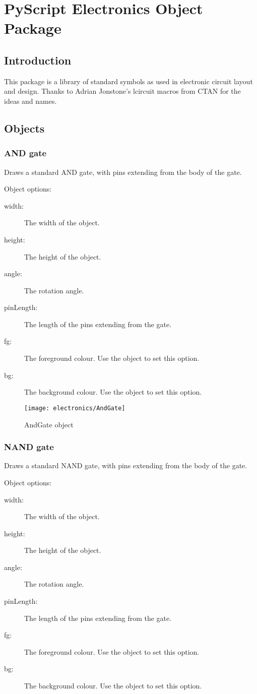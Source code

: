 \chapter{PyScript Electronics Object Package}

\section{Introduction}

This package is a library of standard symbols as used in electronic circuit
layout and design.  Thanks to Adrian Jonstone's lcircuit macros from CTAN
for the ideas and names.

\section{Objects}

\subsection{AND gate}
Draws a standard AND gate, with pins extending from the body of the gate.

Object options:
\begin{description}
\item[width:] The width of the object.
\item[height:] The height of the object.
\item[angle:] The rotation angle.
\item[pinLength:] The length of the pins extending from the gate.
\item[fg:] The foreground colour.  Use the  object to set this
option.
\item[bg:] The background colour.  Use the  object to set this
option.
\end{description}

\begin{figure}[h]
\centerline{\texttt{[image: electronics/AndGate]}}
\caption{AndGate object}
\label{fig:and_gate}
\end{figure}

\subsection{NAND gate}
Draws a standard NAND gate, with pins extending from the body of the gate.

Object options:
\begin{description}
\item[width:] The width of the object.
\item[height:] The height of the object.
\item[angle:] The rotation angle.
\item[pinLength:] The length of the pins extending from the gate.
\item[fg:] The foreground colour.  Use the  object to set this
option.
\item[bg:] The background colour.  Use the  object to set this
option.
\end{description}

